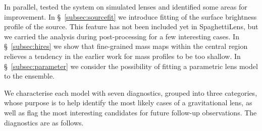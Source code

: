 In parallel, \citet{2015MNRAS.447.2170K} tested the system on
simulated lenses and identified some areas for improvement.  In
\S~\ref{subsec:sourcefit} we introduce fitting of the surface
brightness profile of the source.  This feature has not been included
yet in SpaghettiLens, but we carried the analysis during
post-processing for a few interesting cases.  In \S~\ref{subsec:hires}
we show that fine-grained mass maps within the central region
relieves a tendency in the earlier work for mass profiles to be too
shallow. In \S~\ref{subsec:parameter} we consider the possibility
of fitting a parametric lens model to the ensemble.

We characterise each model with seven diagnostics, grouped into three
categories, whose purpose is to help identify the most likely cases of
a gravitational lens, as well as flag the most interesting candidates
for future follow-up observations. The diagnostics are as follows.

